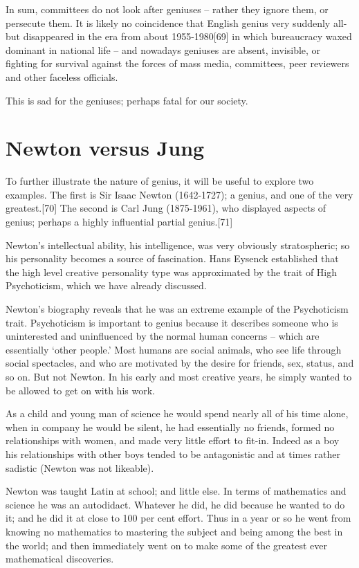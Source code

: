 \documentclass[
]{book}
\begin{document}
In sum, committees do not look after geniuses -- rather they ignore them, or persecute them. It is likely no coincidence that English genius very suddenly all-but disappeared in the era from about 1955-1980{[}69{]} in which bureaucracy waxed dominant in national life -- and nowadays geniuses are absent, invisible, or fighting for survival against the forces of mass media, committees, peer reviewers and other faceless officials.

This is sad for the geniuses; perhaps fatal for our society.

\hypertarget{newton-versus-jung}{%
\chapter{Newton versus Jung}\label{newton-versus-jung}}

To further illustrate the nature of genius, it will be useful to explore two examples. The first is Sir Isaac Newton (1642-1727); a genius, and one of the very greatest.{[}70{]} The second is Carl Jung (1875-1961), who displayed aspects of genius; perhaps a highly influential partial genius.{[}71{]}

Newton's intellectual ability, his intelligence, was very obviously stratospheric; so his personality becomes a source of fascination. Hans Eysenck established that the high level creative personality type was approximated by the trait of High Psychoticism, which we have already discussed.

Newton's biography reveals that he was an extreme example of the Psychoticism trait. Psychoticism is important to genius because it describes someone who is uninterested and uninfluenced by the normal human concerns -- which are essentially `other people.' Most humans are social animals, who see life through social spectacles, and who are motivated by the desire for friends, sex, status, and so on. But not Newton. In his early and most creative years, he simply wanted to be allowed to get on with his work.

As a child and young man of science he would spend nearly all of his time alone, when in company he would be silent, he had essentially no friends, formed no relationships with women, and made very little effort to fit-in. Indeed as a boy his relationships with other boys tended to be antagonistic and at times rather sadistic (Newton was not likeable).

Newton was taught Latin at school; and little else. In terms of mathematics and science he was an autodidact. Whatever he did, he did because he wanted to do it; and he did it at close to 100 per cent effort. Thus in a year or so he went from knowing no mathematics to mastering the subject and being among the best in the world; and then immediately went on to make some of the greatest ever mathematical discoveries.
\end{document}

